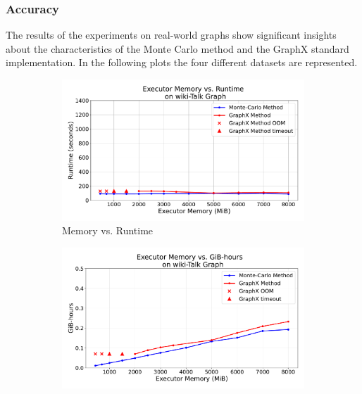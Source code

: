 \subsubsection{Accuracy}

The results of the experiments on real-world graphs show significant insights about the characteristics of the Monte Carlo method and the GraphX standard implementation. In the following plots the four different datasets are represented.\par

\begin{figure}[H]
    \centering
    \begin{subfigure}[t]{0.5\linewidth}
        \centering
        \includegraphics[width=\linewidth]{images/plots/wiki-Talk/memory_vs_runtime_wiki_talk.pdf}
        \caption{Memory vs. Runtime}
        \label{fig:wikirun}
    \end{subfigure}\hfill
    \begin{subfigure}[t]{0.5\linewidth}
        \centering
        \includegraphics[width=\linewidth]{images/plots/wiki-Talk/gbhrs_nodes_wiki_talk.pdf}

\end{subfigure}
\end{figure}
